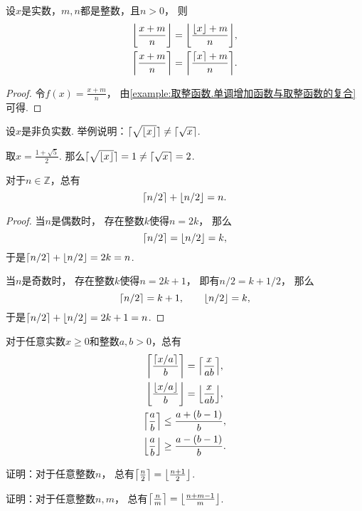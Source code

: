 \begin{example}
设\(x\)是实数，\(m,n\)都是整数，且\(n>0\)，
则\begin{gather}
	\floor*{\frac{x+m}{n}} = \floor*{\frac{\floor{x}+m}{n}}, \\
	\ceil*{\frac{x+m}{n}} = \ceil*{\frac{\ceil{x}+m}{n}}.
\end{gather}
\begin{proof}
令\(f(x) = \frac{x+m}{n}\)，
由\cref{example:取整函数.单调增加函数与取整函数的复合} 可得.
\end{proof}
\end{example}
\begin{example}
设\(x\)是非负实数.
举例说明：\(\ceil{\sqrt{\floor{x}}} \neq \ceil{\sqrt{x}}\).
\begin{solution}
取\(x = \frac{1+\sqrt5}2\).
那么\(\ceil{\sqrt{\floor{x}}} = 1 \neq \ceil{\sqrt{x}} = 2\).
\end{solution}
\end{example}

\begin{property}
对于\(n\in\mathbb{Z}\)，总有\begin{equation}
	\ceil{n/2} + \floor{n/2} = n.
\end{equation}
\begin{proof}
当\(n\)是偶数时，
存在整数\(k\)使得\(n=2k\)，
那么\begin{equation*}
	\ceil{n/2} = \floor{n/2} = k,
\end{equation*}
于是\(\ceil{n/2} + \floor{n/2} = 2k = n\).

当\(n\)是奇数时，
存在整数\(k\)使得\(n=2k+1\)，
即有\(n/2 = k + 1/2\)，
那么\begin{equation*}
	\ceil{n/2} = k+1,
	\qquad
	\floor{n/2} = k,
\end{equation*}
于是\(\ceil{n/2} + \floor{n/2} = 2k+1 = n\).
\end{proof}
\end{property}

\begin{property}
对于任意实数\(x \geq 0\)和整数\(a,b>0\)，总有\begin{gather}
	\ceil*{\frac{\ceil{x/a}}{b}} = \ceil*{\frac{x}{ab}}, \\
	\floor*{\frac{\floor{x/a}}{b}} = \floor*{\frac{x}{ab}}, \\
	\ceil*{\frac{a}{b}} \leq \frac{a+(b-1)}{b}, \\
	\floor*{\frac{a}{b}} \geq \frac{a-(b-1)}{b}.
\end{gather}
\end{property}

\begin{example}
证明：对于任意整数\(n\)，
总有\(\ceil*{\frac{n}2\vphantom{\frac12}} = \floor*{\frac{n+1}2}\).
\end{example}
\begin{example}
证明：对于任意整数\(n,m\)，
总有\(\ceil*{\frac{n}{m}\vphantom{\frac12}} = \floor*{\frac{n+m-1}{m}}\).
\end{example}
